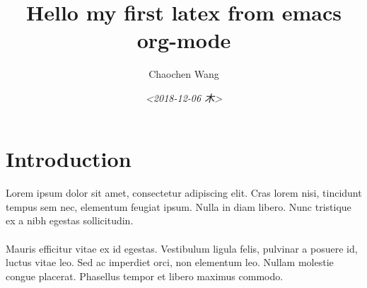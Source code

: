 \documentclass[11pt]{article}
\author{Chaochen Wang}
\date{\textit{<2018-12-06 木>}}
\title{Hello my first latex from emacs org-mode}
\begin{document}
\maketitle

\section{Introduction}
\label{sec:orgc49f26c}


\paragraph{}
Lorem ipsum dolor sit amet, consectetur adipiscing elit. Cras lorem
nisi, tincidunt tempus sem nec, elementum feugiat ipsum. Nulla in
diam libero. Nunc tristique ex a nibh egestas sollicitudin.

\paragraph{}
Mauris efficitur vitae ex id egestas. Vestibulum ligula felis,
pulvinar a posuere id, luctus vitae leo. Sed ac imperdiet orci, non
elementum leo. Nullam molestie congue placerat. Phasellus tempor et
libero maximus commodo.
\end{document}
